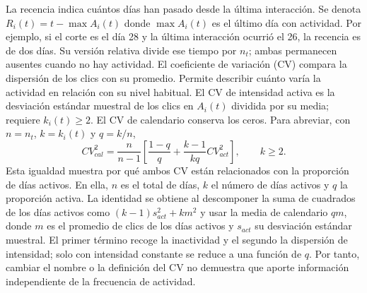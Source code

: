 La recencia indica cuántos días han pasado desde la última interacción. Se denota $R_i(t)=t-\max A_i(t)$ donde $\max A_i(t)$ es el último día con actividad. Por ejemplo, si el corte es el día 28 y la última interacción ocurrió el 26, la recencia es de dos días. Su versión relativa divide ese tiempo por $n_t$; ambas permanecen ausentes cuando no hay actividad. El coeficiente de variación (CV) compara la dispersión de los clics con su promedio. Permite describir cuánto varía la actividad en relación con su nivel habitual. El CV de intensidad activa es la desviación estándar muestral de los clics en $A_i(t)$ dividida por su media; requiere $k_i(t)\ge2$. El CV de calendario conserva los ceros. Para abreviar, con $n=n_t$, $k=k_i(t)$ y $q=k/n$,
\begin{equation}
CV_{cal}^{2}=\frac{n}{n-1}\left[\frac{1-q}{q}+\frac{k-1}{kq}CV_{act}^{2}\right],\qquad k\ge2.\label{corr:identidadcv}
\end{equation}
Esta igualdad muestra por qué ambos CV están relacionados con la proporción de días activos. En ella, $n$ es el total de días, $k$ el número de días activos y $q$ la proporción activa. La identidad se obtiene al descomponer la suma de cuadrados de los días activos como $(k-1)s_{act}^{2}+k m^{2}$ y usar la media de calendario $qm$, donde $m$ es el promedio de clics de los días activos y $s_{act}$ su desviación estándar muestral. El primer término recoge la inactividad y el segundo la dispersión de intensidad; solo con intensidad constante se reduce a una función de $q$. Por tanto, cambiar el nombre o la definición del CV no demuestra que aporte información independiente de la frecuencia de actividad.

